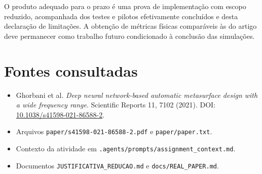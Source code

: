 \documentclass[11pt,a4paper]{article}
\begin{document}
O produto adequado para o prazo é uma prova de implementação com escopo reduzido, acompanhada dos testes e pilotos efetivamente concluídos e desta declaração de limitações. A obtenção de métricas físicas comparáveis às do artigo deve permanecer como trabalho futuro condicionado à conclusão das simulações.

\section*{Fontes consultadas}

\begin{itemize}
\item Ghorbani et al. \textit{Deep neural network-based automatic metasurface design with a wide frequency range}. Scientific Reports 11, 7102 (2021). DOI: \href{https://doi.org/10.1038/s41598-021-86588-2}{10.1038/s41598-021-86588-2}.
\item Arquivos \texttt{paper/s41598-021-86588-2.pdf} e \texttt{paper/paper.txt}.
\item Contexto da atividade em \texttt{.agents/prompts/assignment\_context.md}.
\item Documentos \texttt{JUSTIFICATIVA\_REDUCAO.md} e \texttt{docs/REAL\_PAPER.md}.
\end{itemize}
\end{document}
